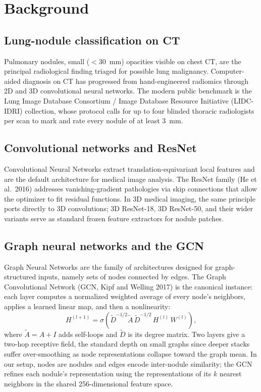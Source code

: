 \documentclass[10pt,letterpaper,twocolumn]{article}
\begin{document}
\section{Background}
\label{sec:background}

\subsection{Lung-nodule classification on CT}

Pulmonary nodules, small ($<30$~mm) opacities visible on chest CT, are the principal radiological finding triaged for possible lung malignancy. Computer-aided diagnosis on CT has progressed from hand-engineered radiomics through 2D and 3D convolutional neural networks. The modern public benchmark is the Lung Image Database Consortium / Image Database Resource Initiative (LIDC-IDRI) collection, whose protocol calls for up to four blinded thoracic radiologists per scan to mark and rate every nodule of at least 3~mm.

\subsection{Convolutional networks and ResNet}

Convolutional Neural Networks extract translation-equivariant local features and are the default architecture for medical image analysis. The ResNet family (He et al.\ 2016) addresses vanishing-gradient pathologies via skip connections that allow the optimizer to fit residual functions. In 3D medical imaging, the same principle ports directly to 3D convolutions; 3D ResNet-18, 3D ResNet-50, and their wider variants serve as standard frozen feature extractors for nodule patches.

\subsection{Graph neural networks and the GCN}

Graph Neural Networks are the family of architectures designed for graph-structured inputs, namely sets of nodes connected by edges. The Graph Convolutional Network (GCN, Kipf and Welling 2017) is the canonical instance: each layer computes a normalized weighted average of every node's neighbors, applies a learned linear map, and then a nonlinearity:
\begin{equation}
\label{eq:gcn-update}
H^{(l+1)} = \sigma\!\left(\tilde{D}^{-1/2}\tilde{A}\,\tilde{D}^{-1/2}\,H^{(l)}\,W^{(l)}\right),
\end{equation}
where $\tilde{A} = A + I$ adds self-loops and $\tilde{D}$ is its degree matrix. Two layers give a two-hop receptive field, the standard depth on small graphs since deeper stacks suffer over-smoothing as node representations collapse toward the graph mean. In our setup, nodes are nodules and edges encode inter-nodule similarity; the GCN refines each nodule's representation using the representations of its $k$ nearest neighbors in the shared 256-dimensional feature space.
\end{document}
